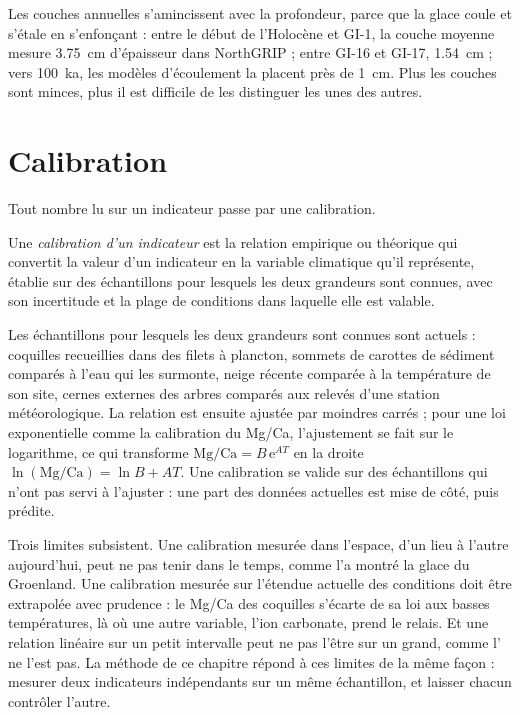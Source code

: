 Les couches annuelles s'amincissent avec la profondeur, parce que la glace coule et s'étale en s'enfonçant : entre le début de
l'Holocène et GI-1, la couche moyenne mesure \qty{3.75}{cm} d'épaisseur dans NorthGRIP ; entre GI-16 et
GI-17, \qty{1.54}{cm} ; vers \qty{100}{ka}, les modèles d'écoulement la placent près de \qty{1}{cm}. Plus les couches sont minces, plus il est difficile de les distinguer
les unes des autres.

\section{Calibration}\label{sec:b2:climate-proxies:calibration}

Tout nombre lu sur un indicateur passe par une calibration.

\begin{definition}\label{def:b2:climate-proxies:calibration}
Une \emph{calibration d'un indicateur} est la relation empirique ou théorique qui
convertit la valeur d'un indicateur en la variable climatique qu'il représente, établie sur des échantillons pour
lesquels les deux grandeurs sont connues, avec son incertitude et la plage de conditions dans laquelle elle est
valable.
\end{definition}

Les échantillons pour lesquels les deux grandeurs sont connues sont actuels : coquilles recueillies dans des filets à plancton, sommets de carottes de sédiment comparés à l'eau qui les surmonte, neige récente comparée à la
température de son site, cernes externes des arbres comparés aux relevés d'une station météorologique.
La relation est ensuite ajustée par moindres carrés ; pour une loi exponentielle comme la calibration du Mg/Ca,
l'ajustement se fait sur le logarithme, ce qui transforme $\text{Mg/Ca} = B\,\mathrm{e}^{AT}$ en
la droite $\ln(\text{Mg/Ca}) = \ln B + AT$. Une calibration se valide sur des échantillons qui n'ont pas servi à l'ajuster :
une part des données actuelles est mise de côté, puis prédite.

Trois limites subsistent. Une calibration mesurée dans l'espace, d'un lieu à l'autre aujourd'hui, peut ne pas tenir
dans le temps, comme l'a montré la glace du Groenland.
Une calibration mesurée sur l'étendue actuelle des conditions
doit être extrapolée avec prudence : le Mg/Ca des coquilles s'écarte de sa loi aux basses températures, là où une autre variable,
l'ion carbonate, prend le relais. Et une relation linéaire sur un petit intervalle peut ne pas l'être sur un grand, comme
l' ne l'est pas. La méthode de ce chapitre répond à ces limites de la même façon :
mesurer deux indicateurs indépendants sur un même échantillon, et laisser chacun contrôler l'autre.

